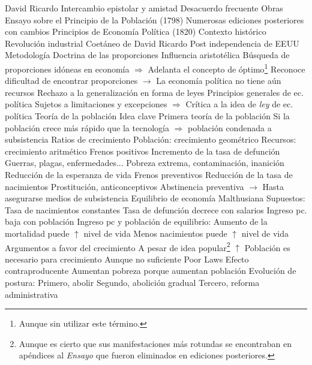 \documentclass{nuevotema}
\begin{document}
\begin{esquemal}
				\4 David Ricardo
				\4[] Intercambio epistolar y amistad
				\4[] Desacuerdo frecuente
			\3 Obras
				\4 Ensayo sobre el Principio de la Población (1798)
				\4[] Numerosas ediciones posteriores con cambios
				\4 Principios de Economía Política (1820)
			\3 Contexto histórico
				\4 Revolución industrial
				\4 Coetáneo de David Ricardo
				\4 Post independencia de EEUU
		\2 Metodología
			\3 Doctrina de las proporciones
				\4 Influencia aristotélica
				\4 Búsqueda de proporciones idóneas en economía
				\4[] $\Rightarrow$ Adelanta el concepto de óptimo\footnote{Aunque sin utilizar este término.}
				\4 Reconoce dificultad de encontrar proporciones
				\4[] $\to$ La economía política no tiene aún recursos
			\3 Rechazo a la generalización en forma de leyes
				\4 Principios generales de ec. política
				\4[] Sujetos a limitaciones y excepciones
				\4[] $\Rightarrow$ Crítica a la idea de \textit{ley} de ec. política
		\2 Teoría de la población
			\3 Idea clave
				\4 Primera teoría de la población
				\4 Si la población crece más rápido que la tecnología
				\4[] $\Rightarrow$ población condenada a subsistencia
			\3 Ratios de crecimiento
				\4 Población: crecimiento geométrico
				\4 Recursos: crecimiento aritmético
			\3 Frenos positivos
				\4 Incremento de la tasa de defunción
				\4[] Guerras, plagas, enfermedades...
				\4[] Pobreza extrema, contaminación, inanición
				\4 Reducción de la esperanza de vida
			\3 Frenos preventivos
				\4 Reducción de la tasa de nacimientos
				\4[] Prostitución, anticonceptivos
				\4[] Abstinencia preventiva
				\4[] $\to$ Hasta asegurarse medios de subsistencia
			\3 Equilibrio de economía Malthusiana
				\4 Supuestos:
				\4[(i)] Tasa de nacimientos constantes
				\4[(ii)] Tasa de defunción decrece con salarios
				\4[(iii)] Ingreso pc. baja con población
				\4[$\to$] Ingreso pc y población de equilibrio: 
				\4[$\Rightarrow$] Aumento de la mortalidad puede $\uparrow$ nivel de vida
				\4[$\Rightarrow$] Menos nacimientos puede $\uparrow$ nivel de vida
			\3 Argumentos a favor del crecimiento
				\4 A pesar de idea popular\footnote{Aunque es cierto que sus manifestaciones más rotundas se encontraban en apéndices al \textit{Ensayo} que fueron eliminados en ediciones posteriores.}
				\4[] $\uparrow$ Población es necesario para crecimiento
				\4[] Aunque no suficiente
			\3 Poor Laws
				\4 Efecto contraproducente
				\4 Aumentan pobreza porque aumentan población
				\4 Evolución de postura:
				\4[] Primero, abolir
				\4[] Segundo, abolición gradual
				\4[] Tercero, reforma administrativa

\end{esquemal}
\end{document}
